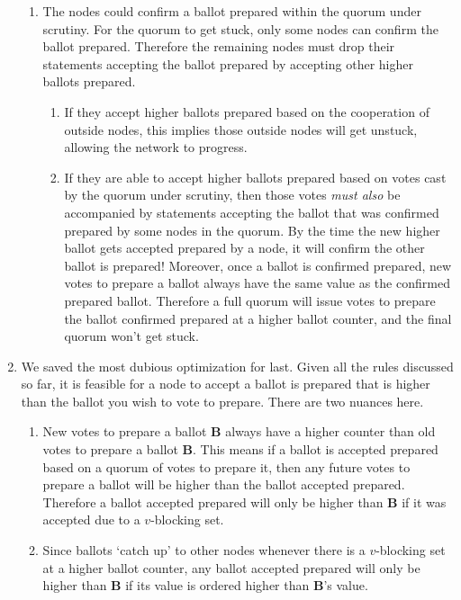 \begin{enumerate}
\begin{enumerate}
        \item The nodes could confirm a ballot prepared within the quorum under scrutiny. For the quorum to get stuck, only some nodes can confirm the ballot prepared. Therefore the remaining nodes must drop their statements accepting the ballot prepared by accepting other higher ballots prepared.
        \begin{enumerate}
            \item If they accept higher ballots prepared based on the cooperation of outside nodes, this implies those outside nodes will get unstuck, allowing the network to progress.

            \item If they are able to accept higher ballots prepared based on votes cast by the quorum under scrutiny, then those votes {\em must also} be accompanied by statements accepting the ballot that was confirmed prepared by some nodes in the quorum. By the time the new higher ballot gets accepted prepared by a node, it will confirm the other ballot is prepared! Moreover, once a ballot is confirmed prepared, new votes to prepare a ballot always have the same value as the confirmed prepared ballot. Therefore a full quorum will issue votes to prepare the ballot confirmed prepared at a higher ballot counter, and the final quorum won't get stuck.
        \end{enumerate}
    \end{enumerate}

    \item We saved the most dubious optimization for last. Given all the rules discussed so far, it is feasible for a node to accept a ballot is prepared that is higher than the ballot you wish to vote to prepare. There are two nuances here.
    \begin{enumerate}
        \item New votes to prepare a ballot \textbf{B} always have a higher counter than old votes to prepare a ballot \textbf{B}. This means if a ballot is accepted prepared based on a quorum of votes to prepare it, then any future votes to prepare a ballot will be higher than the ballot accepted prepared. Therefore a ballot accepted prepared will only be higher than \textbf{B} if it was accepted due to a $v$-blocking set.

        \item Since ballots `catch up' to other nodes whenever there is a $v$-blocking set at a higher ballot counter, any ballot accepted prepared will only be higher than \textbf{B} if its value is ordered higher than \textbf{B}'s value.
    \end{enumerate}


\end{enumerate}
